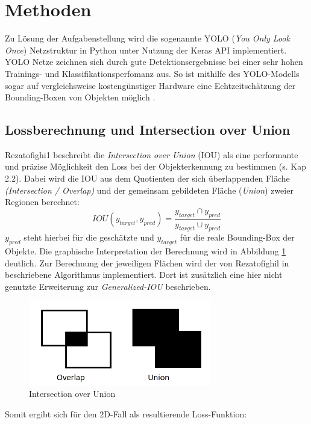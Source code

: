 \section{Methoden}

Zu Lösung der Aufgabenstellung wird die sogenannte YOLO (\textit{You Only Look Once}) Netzstruktur in Python unter Nutzung der Keras API implementiert. YOLO Netze zeichnen sich durch gute Detektionsergebnisse bei einer sehr hohen Trainings- und Klassifikationsperfomanz aus. So ist mithilfe des YOLO-Modells sogar auf vergleichsweise kostengünstiger Hardware eine Echtzeitschätzung der Bounding-Boxen von Objekten möglich \cite{Redmon2016}. 

\subsection{Lossberechnung und Intersection over Union}
\label{Loss_ber}
Rezatofighi1 beschreibt die \textit{Intersection over Union} (IOU) als eine performante und präzise Möglichkeit den Loss bei der Objekterkennung zu bestimmen (s. Kap 2.2). Dabei wird die IOU aus dem Quotienten der sich überlappenden Fläche \textit{(Intersection / Overlap)} und der gemeinsam gebildeten Fläche (\textit{Union}) zweier Regionen berechnet: 
\begin{equation}\label{iou}
	IOU(y_{target},y_{pred})=\frac{y_{target} \cap y_{pred}}{y_{target} \cup y_{pred}}
\end{equation}
$y_{pred}$ steht hierbei für die geschätzte und $y_{target}$ für die reale Bounding-Box der Objekte. Die graphische Interpretation der Berechnung wird in Abbildung \ref{ioubild} deutlich. Zur Berechnung der jeweiligen Flächen wird der von Rezatofighil in \cite{Rezatofighi1902} beschriebene Algorithmus implementiert. Dort ist zusätzlich eine hier nicht genutzte Erweiterung zur \textit{Generalized-IOU} beschrieben.
\begin{figure}[!h]
  \centering
  \includegraphics[width=8cm]{iou.png}
  \caption{Intersection over Union}
  \label{ioubild}
\end{figure} 
\FloatBarrier
Somit ergibt sich für den 2D-Fall als resultierende Loss-Funktion:
